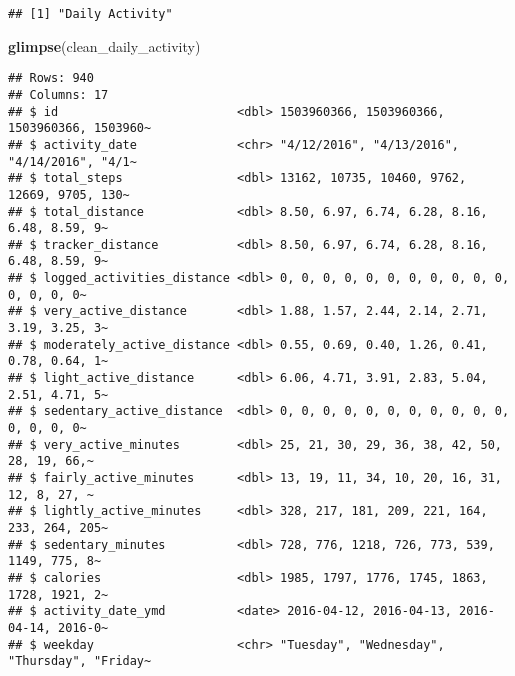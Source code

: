 \documentclass[
]{article}
\newenvironment{Shaded}{\begin{snugshade}}{\end{snugshade}}
\newcommand{\CommentTok}[1]{\textcolor[rgb]{0.56,0.35,0.01}{\textit{#1}}}
\newcommand{\FunctionTok}[1]{\textcolor[rgb]{0.13,0.29,0.53}{\textbf{#1}}}
\newcommand{\NormalTok}[1]{#1}
\newcommand{\OtherTok}[1]{\textcolor[rgb]{0.56,0.35,0.01}{#1}}
\newcommand{\SpecialCharTok}[1]{\textcolor[rgb]{0.81,0.36,0.00}{\textbf{#1}}}
\newcommand{\StringTok}[1]{\textcolor[rgb]{0.31,0.60,0.02}{#1}}
\begin{document}
\begin{Shaded}
\end{Shaded}

\begin{verbatim}
## [1] "Daily Activity"
\end{verbatim}

\begin{Shaded}
\begin{Highlighting}[]
\FunctionTok{glimpse}\NormalTok{(clean\_daily\_activity)}
\end{Highlighting}
\end{Shaded}

\begin{verbatim}
## Rows: 940
## Columns: 17
## $ id                         <dbl> 1503960366, 1503960366, 1503960366, 1503960~
## $ activity_date              <chr> "4/12/2016", "4/13/2016", "4/14/2016", "4/1~
## $ total_steps                <dbl> 13162, 10735, 10460, 9762, 12669, 9705, 130~
## $ total_distance             <dbl> 8.50, 6.97, 6.74, 6.28, 8.16, 6.48, 8.59, 9~
## $ tracker_distance           <dbl> 8.50, 6.97, 6.74, 6.28, 8.16, 6.48, 8.59, 9~
## $ logged_activities_distance <dbl> 0, 0, 0, 0, 0, 0, 0, 0, 0, 0, 0, 0, 0, 0, 0~
## $ very_active_distance       <dbl> 1.88, 1.57, 2.44, 2.14, 2.71, 3.19, 3.25, 3~
## $ moderately_active_distance <dbl> 0.55, 0.69, 0.40, 1.26, 0.41, 0.78, 0.64, 1~
## $ light_active_distance      <dbl> 6.06, 4.71, 3.91, 2.83, 5.04, 2.51, 4.71, 5~
## $ sedentary_active_distance  <dbl> 0, 0, 0, 0, 0, 0, 0, 0, 0, 0, 0, 0, 0, 0, 0~
## $ very_active_minutes        <dbl> 25, 21, 30, 29, 36, 38, 42, 50, 28, 19, 66,~
## $ fairly_active_minutes      <dbl> 13, 19, 11, 34, 10, 20, 16, 31, 12, 8, 27, ~
## $ lightly_active_minutes     <dbl> 328, 217, 181, 209, 221, 164, 233, 264, 205~
## $ sedentary_minutes          <dbl> 728, 776, 1218, 726, 773, 539, 1149, 775, 8~
## $ calories                   <dbl> 1985, 1797, 1776, 1745, 1863, 1728, 1921, 2~
## $ activity_date_ymd          <date> 2016-04-12, 2016-04-13, 2016-04-14, 2016-0~
## $ weekday                    <chr> "Tuesday", "Wednesday", "Thursday", "Friday~
\end{verbatim}
\end{document}
